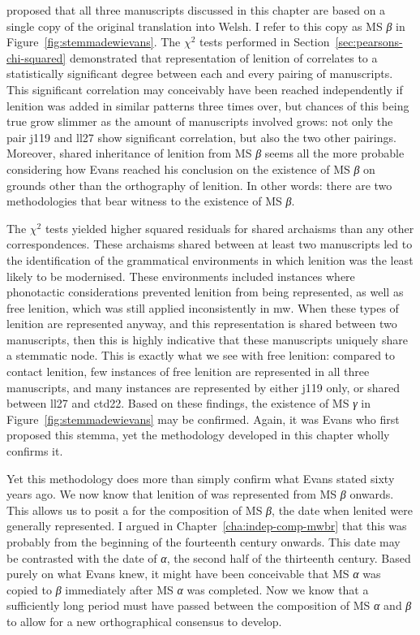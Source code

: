 \Textcite[lviii]{Eva_Welsh88} proposed that all three manuscripts discussed in this chapter are based on a single copy of the original translation into Welsh. I refer to this copy as MS \textit{β} in Figure~\ref{fig:stemmadewievans}. The \(\chi^2\) tests performed in Section~\ref{sec:pearsons-chi-squared} demonstrated that representation of lenition of  correlates to a statistically significant degree between each and every pairing of manuscripts. This significant correlation may conceivably have been reached independently if lenition was added in similar patterns three times over, but chances of this being true grow slimmer as the amount of manuscripts involved grows: not only the pair \gls{j119} and \gls{ll27} show significant correlation, but also the two other pairings. Moreover, shared inheritance of lenition from MS \textit{β} seems all the more probable considering how Evans reached his conclusion on the existence of MS \textit{β} on grounds other than the orthography of lenition. In other words: there are two methodologies that bear witness to the existence of MS \textit{β}. 

The \(\chi^2\) tests yielded higher squared residuals for shared archaisms than any other correspondences. These archaisms shared between at least two manuscripts led to the identification of the grammatical environments in which lenition was the least likely to be modernised. These environments included instances where phonotactic considerations prevented lenition from being represented, as well as free lenition, which was still applied inconsistently in \gls{mw}. When these types of lenition are represented anyway, and this representation is shared between two manuscripts, then this is highly indicative that these manuscripts uniquely share a stemmatic node. This is exactly what we see with free lenition: compared to contact lenition, few instances of free lenition are represented in all three manuscripts, and many instances are represented by either \gls{j119} only, or shared between \gls{ll27} and \gls{ctd22}. Based on these findings, the existence of MS \textit{γ} in Figure~\ref{fig:stemmadewievans} may be confirmed. Again, it was Evans who first proposed this stemma, yet the methodology developed in this chapter wholly confirms it.

Yet this methodology does more than simply confirm what Evans stated sixty years ago. We now know  that lenition of  was represented from MS \textit{β} onwards. This allows us to posit a  for the composition of MS \textit{β}, \ie the date when lenited  were generally represented. I argued in Chapter~\ref{cha:indep-comp-mwbr} that this was probably from the beginning of the fourteenth century onwards. This date may be contrasted with the date of \textit{α}, the second half of the thirteenth century. Based purely on what Evans knew, it might have been conceivable that MS \textit{α} was copied to \textit{β} immediately after  MS \textit{α} was completed. Now we know that a sufficiently long period must have passed between the composition of MS \textit{α} and \textit{β} to allow for a new orthographical consensus to develop. 


